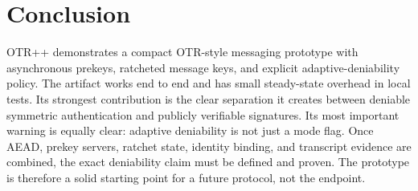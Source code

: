 \documentclass[11pt]{article}
\newcommand{\prot}{OTR++}
\begin{document}
\section{Conclusion}

\prot{} demonstrates a compact OTR-style messaging prototype with asynchronous prekeys, ratcheted message keys, and explicit adaptive-deniability policy. The artifact works end to end and has small steady-state overhead in local tests. Its strongest contribution is the clear separation it creates between deniable symmetric authentication and publicly verifiable signatures. Its most important warning is equally clear: adaptive deniability is not just a mode flag. Once AEAD, prekey servers, ratchet state, identity binding, and transcript evidence are combined, the exact deniability claim must be defined and proven. The prototype is therefore a solid starting point for a future protocol, not the endpoint.



\end{document}
